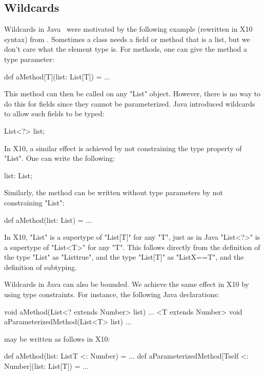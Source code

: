\documentclass[preprint,nocopyrightspace,9pt]{sigplanconf}
\begin{document}
\subsection{Wildcards}

Wildcards in Java~\cite{Java3,adding-wildcards} were motivated
by the following example (rewritten in X10 syntax)
from \cite{adding-wildcards}.
Sometimes a class needs a field or method
that is a list, but we don't care what the element type is.
For methods, one can give the method a type parameter:
\begin{xten}
def aMethod[T](list: List[T]) = { ... }
\end{xten}
This method can then be called on any \xcd"List" object.
However, there is no way to do this for fields since they
cannot be parameterized.
Java introduced wildcards to allow such fields to be
typed:
\begin{xten}
List<?> list;
\end{xten}
In X10, a similar effect is achieved by not constraining the
type property of \xcd"List".
One can write the following:
\begin{xten}
list: List;
\end{xten}
Similarly, the method can be written without type parameters by
not constraining \xcd"List":
\begin{xten}
def aMethod(list: List) = { ... }
\end{xten}

In X10, \xcd"List"
is a supertype of
\xcd"List[T]" for any \xcd"T",
just as in Java
\xcd"List<?>" is a supertype of
\xcd"List<T>" for any \xcd"T".
This follows directly from the definition of the type \xcd"List"
as \xcd"List{true}", and the type \xcd"List[T]"
as \xcd"List{X==T}", and the definition of subtyping.

Wildcards in Java can also be bounded.
We achieve the same
effect in X10 by using type constraints.
For instance, the following Java declarations:
\begin{xten}
void aMethod(List<? extends Number> list) { ... }
<T extends Number> void aParameterizedMethod(List<T> list) { ... }
\end{xten}
may be written as follows in X10:
\begin{xten}
def aMethod(list: List{T <: Number}) = { ... }
def aParameterizedMethod[T{self <: Number}](list: List[T]) = { ... }
\end{xten}
\end{document}
